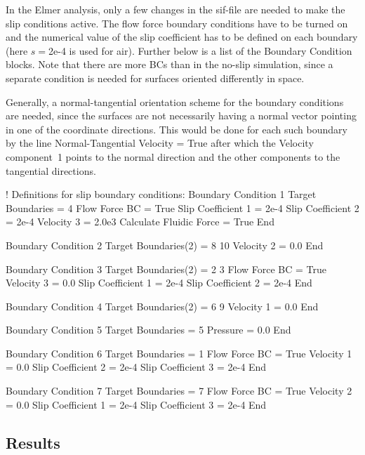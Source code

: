 In the Elmer analysis, only a few changes in the sif-file are needed
to make the slip conditions active. The flow force boundary conditions
have to be turned on and the numerical value of the slip coefficient
has to be defined on each boundary (here $s=$2e-4 is used for
air). Further below is a list of the Boundary Condition blocks. Note
that there are more BCs than in the no-slip simulation, since a
separate condition is needed for surfaces oriented differently in
space.

Generally, a normal-tangential orientation scheme for the boundary
conditions are needed, since the surfaces are not necessarily having a
normal vector pointing in one of the coordinate directions. This would
be done for each such boundary by the line
\ttbegin
  Normal-Tangential Velocity = True
\ttend
after which the Velocity component~1 points to the normal direction
and the other components to the tangential directions.

\ttbegin
! Definitions for slip boundary conditions:
Boundary Condition 1
  Target Boundaries = 4
   Flow Force BC = True
   Slip Coefficient 1 = 2e-4
   Slip Coefficient 2 = 2e-4
   Velocity 3 = 2.0e3
   Calculate Fluidic Force = True
End

Boundary Condition 2
  Target Boundaries(2) = 8 10
   Velocity 2 = 0.0
End

Boundary Condition 3
  Target Boundaries(2) = 2 3
   Flow Force BC = True
   Velocity 3 = 0.0
   Slip Coefficient 1 = 2e-4
   Slip Coefficient 2 = 2e-4
End

Boundary Condition 4
  Target Boundaries(2) = 6 9
   Velocity 1 = 0.0
End

Boundary Condition 5
  Target Boundaries = 5
  Pressure = 0.0
End

Boundary Condition 6
  Target Boundaries = 1
   Flow Force BC = True
   Velocity 1 = 0.0
   Slip Coefficient 2 = 2e-4
   Slip Coefficient 3 = 2e-4
End

Boundary Condition 7
  Target Boundaries = 7
   Flow Force BC = True
   Velocity 2 = 0.0
   Slip Coefficient 1 = 2e-4
   Slip Coefficient 3 = 2e-4
End
\ttend

\subsection*{Results}

